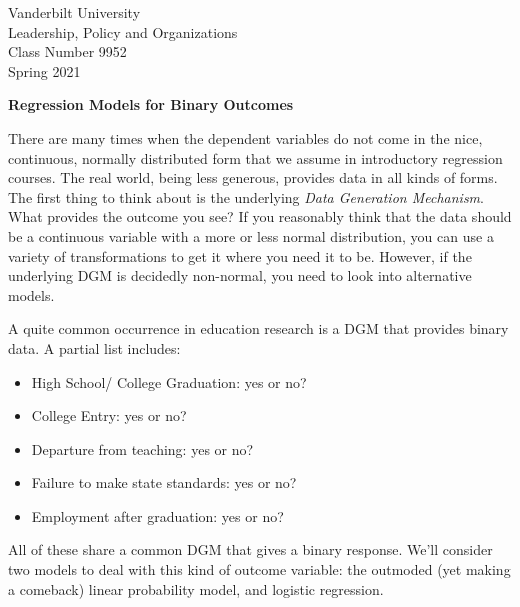 \documentclass[12pt]{article}
\begin{document}
\thispagestyle{empty}%

\setlength{\parskip}{1ex plus 0.5ex minus 0.2ex}

\setcounter{secnumdepth}{-2}


\begin{flushleft}
Vanderbilt University\\Leadership, Policy and Organizations\\Class Number 9952\\ Spring 2021\\
\end{flushleft}

\begin{center}
\textbf{Regression Models for Binary Outcomes}
\end{center}


There are many times when the dependent variables do not come in the
nice, continuous, normally distributed form that we assume in
introductory regression courses. The real world, being less generous,
provides data in all kinds of forms. The first thing to think about is
the underlying \textit{Data Generation Mechanism}. What provides the
outcome you see? If you reasonably think that the data should be a
continuous variable with a more or less normal distribution, you can
use a variety of transformations to get it where you need it to
be. However, if the underlying DGM is decidedly non-normal, you need
to look into alternative models.

A quite common occurrence in education research is a DGM that provides
binary data. A partial list includes:

\begin{itemize}
\item High School/ College Graduation: yes or no?

\item College Entry: yes or no?

\item Departure from teaching: yes or no?

\item Failure to make state standards: yes or no?

\item Employment after graduation: yes or no?

\end{itemize}

All of these share a common DGM that gives a binary response. We'll
consider two models to deal with this kind of outcome variable: the
outmoded (yet making a comeback) linear probability model, and logistic regression. 
\end{document}
